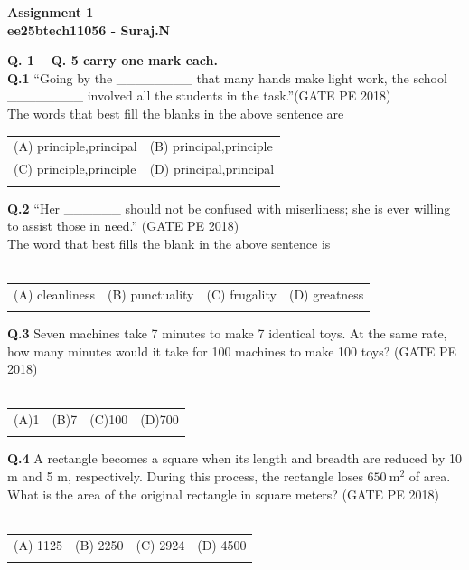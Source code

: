 \documentclass[12pt,a4paper]{article}
\begin{document}
\begin{center}
{\Large \textbf{Assignment 1}}\\
{\normalsize \textbf{ee25btech11056 - Suraj.N}}
\end{center}


\noindent\textbf{Q. 1 – Q. 5 carry one mark each.} \\[0.8em]

\noindent\textbf{Q.1} ``Going by the \_\_\_\_\_\_\_\_ that many hands make light work, the school \_\_\_\_\_\_\_\_ involved all the students in the task.''\hfill (GATE PE 2018) \\[0.3em]
The words that best fill the blanks in the above sentence are \\

\begin{tabular}{ll}

(A) principle,principal & (B) principal,principle\\
(C) principle,principle & (D) principal,principal\\\\
\end{tabular}

\noindent\textbf{Q.2} ``Her \_\_\_\_\_\_ should not be confused with miserliness; she is ever willing to assist those in need.'' \hfill(GATE PE 2018) \\
The word that best fills the blank in the above sentence is \\\\
\begin{tabular}{llll}
(A) cleanliness & (B) punctuality & (C) frugality & (D) greatness\\\\
\end{tabular}

\noindent\textbf{Q.3} Seven machines take 7 minutes to make 7 identical toys. At the same rate, how many minutes would it take for 100 machines to make 100 toys? \hfill(GATE PE 2018)\\\\
\begin{tabular}{llll}(A)1 & (B)7 & (C)100 & (D)700 \\\\
\end{tabular}

\noindent\textbf{Q.4} A rectangle becomes a square when its length and breadth are reduced by 10 m and 5 m, respectively. During this process, the rectangle loses $650 \ \mathrm{m}^2$ of area. What is the area of the original rectangle in square meters? \hfill(GATE PE 2018) \\\\
\begin{tabular}{llll}
(A) 1125  & (B) 2250 & (C) 2924 & (D) 4500\\\\
\end{tabular}
\end{document}
